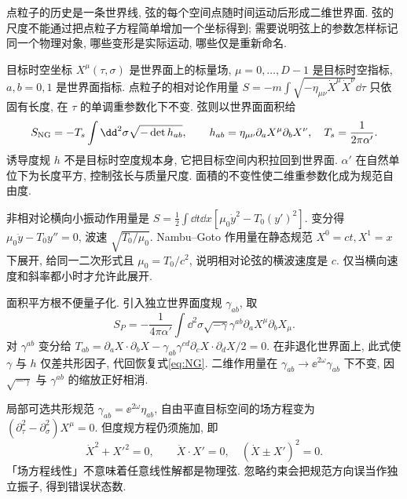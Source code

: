 \label{ch:action}
点粒子的历史是一条世界线, 弦的每个空间点随时间运动后形成二维世界面. 弦的尺度不能通过把点粒子方程简单增加一个坐标得到; 需要说明弦上的参数怎样标记同一个物理对象, 哪些变形是实际运动, 哪些仅是重新命名.

目标时空坐标 $X^\mu(\tau,\sigma)$ 是世界面上的标量场, $\mu=0,\ldots,D-1$ 是目标时空指标, $a,b=0,1$ 是世界面指标. 点粒子的相对论作用量 $S=-m\int\sqrt{-\eta_{\mu\nu}\dot X^\mu\dot X^\nu}\dd\tau$ 只依固有长度, 在 $\tau$ 的单调重参数化下不变. 弦则以世界面面积给
\begin{equation}\label{eq:NG}
S_{\rm NG}=-T_s\int\dd^2\sigma\sqrt{-\det h_{ab}},\qquad
h_{ab}=\eta_{\mu\nu}\partial_aX^\mu\partial_bX^\nu,
\quad T_s=\frac1{2\pi\alpha'}.
\end{equation}
诱导度规 $h$ 不是目标时空度规本身, 它把目标空间内积拉回到世界面. $\alpha'$ 在自然单位下为长度平方, 控制弦长与质量尺度. 面積的不变性使二维重参数化成为规范自由度.

非相对论横向小振动作用量是 $S=\frac12\int\dd t\dd x[\mu_0\dot y^2-T_0(y')^2]$. 变分得 $\mu_0\ddot y-T_0y''=0$, 波速 $\sqrt{T_0/\mu_0}$. Nambu--Goto 作用量在静态规范 $X^0=ct,X^1=x$ 下展开, 给同一二次形式且 $\mu_0=T_0/c^2$, 说明相对论弦的横波速度是 $c$. 仅当横向速度和斜率都小时才允许此展开.

面积平方根不便量子化. 引入独立世界面度规 $\gamma_{ab}$, 取
\begin{equation}\label{eq:Polyakov}
S_P=-\frac1{4\pi\alpha'}\int\dd^2\sigma\sqrt{-\gamma}\gamma^{ab}
\partial_aX^\mu\partial_bX_\mu.
\end{equation}
对 $\gamma^{ab}$ 变分给 $T_{ab}=\partial_aX\cdot\partial_bX-\gamma_{ab}\gamma^{cd}\partial_cX\cdot\partial_dX/2=0$. 在非退化世界面上, 此式使 $\gamma$ 与 $h$ 仅差共形因子, 代回恢复式\eqref{eq:NG}. 二维作用量在 $\gamma_{ab}\to\ee^{2\omega}\gamma_{ab}$ 下不变, 因 $\sqrt{-\gamma}$ 与 $\gamma^{ab}$ 的缩放正好相消.

局部可选共形规范 $\gamma_{ab}=\ee^{2\omega}\eta_{ab}$, 自由平直目标空间的场方程变为 $(\partial_\tau^2-\partial_\sigma^2)X^\mu=0$. 但度规方程仍须施加, 即
\begin{equation}\label{eq:constraints}
\dot X^2+X'^2=0,\qquad\dot X\cdot X'=0,
\quad(\dot X\pm X')^2=0.
\end{equation}
「场方程线性」不意味着任意线性解都是物理弦. 忽略约束会把规范方向误当作独立振子, 得到错误状态数.

